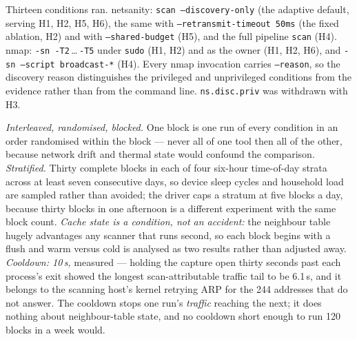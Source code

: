 \documentclass[conference]{IEEEtran}
\newcommand{\netsanity}{\textsf{netsanity}}
\begin{document}
Thirteen conditions ran. \netsanity{}: \texttt{scan --discovery-only} (the
adaptive default, serving H1, H2, H5, H6), the same with
\texttt{--retransmit-timeout 50ms} (the fixed ablation, H2) and with
\texttt{--shared-budget} (H5), and the full pipeline \texttt{scan} (H4). nmap:
\texttt{-sn -T2}\,\ldots\,\texttt{-T5} under \texttt{sudo} (H1, H2) and as the
owner (H1, H2, H6), and \texttt{-sn --script broadcast-*} (H4). Every nmap
invocation carries \texttt{--reason}, so the discovery reason distinguishes the
privileged and unprivileged conditions from the evidence rather than from the
command line. \texttt{ns.disc.priv} was withdrawn with H3.

\emph{Interleaved, randomised, blocked.} One block is one run of every
condition in an order randomised within the block --- never all of one tool
then all of the other, because network drift and thermal state would confound
the comparison. \emph{Stratified.} Thirty complete blocks in each of four
six-hour time-of-day strata across at least seven consecutive days, so device
sleep cycles and household load are sampled rather than avoided; the driver
caps a stratum at five blocks a day, because thirty blocks in one afternoon is
a different experiment with the same block count. \emph{Cache state is a
condition, not an accident:} the neighbour table hugely advantages any scanner
that runs second, so each block begins with a flush and warm versus cold is
analysed as two results rather than adjusted away. \emph{Cooldown: 10\,s,}
measured --- holding the capture open thirty seconds past each process's exit
showed the longest scan-attributable traffic tail to be 6.1\,s, and it belongs
to the scanning host's kernel retrying ARP for the 244 addresses that do not
answer. The cooldown stops one run's \emph{traffic} reaching the next; it does
nothing about neighbour-table state, and no cooldown short enough to run 120
blocks in a week would.
\end{document}
